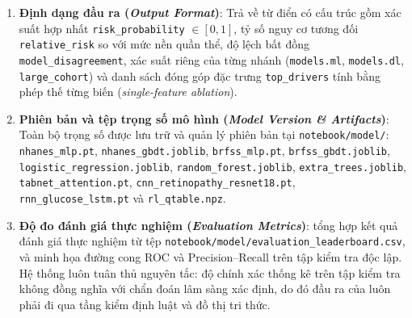 \begin{enumerate}
  \item \textbf{Định dạng đầu ra (\emph{Output Format})}:
  Trả về từ điển có cấu trúc gồm xác suất hợp nhất \texttt{risk\_probability} $\in [0,1]$, tỷ số nguy cơ tương đối \texttt{relative\_risk} so với mức nền quần thể, độ lệch bất đồng \texttt{model\_disagreement}, xác suất riêng của từng nhánh (\texttt{models.ml}, \texttt{models.dl}, \texttt{large\_cohort}) và danh sách đóng góp đặc trưng \texttt{top\_drivers} tính bằng phép thế từng biến (\emph{single-feature ablation}).

  \item \textbf{Phiên bản và tệp trọng số mô hình (\emph{Model Version \& Artifacts})}:
  Toàn bộ trọng số được lưu trữ và quản lý phiên bản tại \texttt{notebook/model/}: \texttt{nhanes\_mlp.pt}, \texttt{nhanes\_gbdt.joblib}, \texttt{brfss\_mlp.pt}, \texttt{brfss\_gbdt.joblib}, \texttt{logistic\_regression.joblib}, \texttt{random\_forest.joblib}, \texttt{extra\_trees.joblib}, \texttt{tabnet\_attention.pt}, \texttt{cnn\_retinopathy\_resnet18.pt}, \texttt{rnn\_glucose\_lstm.pt} và \texttt{rl\_qtable.npz}.

  \item \textbf{Độ đo đánh giá thực nghiệm (\emph{Evaluation Metrics})}:
   tổng hợp kết quả đánh giá thực nghiệm từ tệp \texttt{notebook/model/evaluation\_leaderboard.csv}, và  minh họa đường cong ROC và Precision--Recall trên tập kiểm tra độc lập. Hệ thống luôn tuân thủ nguyên tắc: độ chính xác thống kê trên tập kiểm tra không đồng nghĩa với chẩn đoán lâm sàng xác định, do đó đầu ra của  luôn phải đi qua tầng kiểm định luật và đồ thị tri thức.
\end{enumerate}

